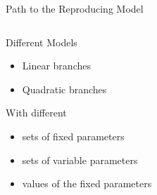 \begin{frame}{Path to the Reproducing Model}
    \begin{columns}
        \begin{column}{.5 \textwidth}
            Different Models
            \begin{itemize}
                \item Linear branches
                \item Quadratic branches
            \end{itemize}

            \vspace{2em}
            With different
            \begin{itemize}
                \item sets of fixed parameters
                \item sets of variable parameters
                \item values of the fixed parameters
            \end{itemize}
        \end{column}
        \begin{column}{.5 \textwidth}
            \vspace{-3.0em}
            \begin{figure}
                \centering
                \qquad
                \\
                \qquad
            \end{figure}
        \end{column}
    \end{columns}
\end{frame}

